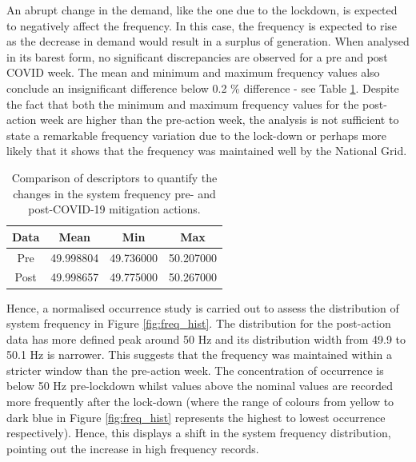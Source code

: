 \documentclass[energies,article,submit,moreauthors,pdftex]{Definitions/mdpi}
\begin{document}
An abrupt change in the demand, like the one due to the lockdown, is expected to negatively affect the frequency. In this case, the frequency is expected to rise as the decrease in demand would result in a surplus of generation.
When analysed in its barest form, no significant discrepancies are observed for a pre and post COVID week. The mean and minimum and maximum frequency values also conclude an insignificant difference below 0.2 \% difference - see Table \ref{table:freq_table}. Despite the fact that both the minimum and maximum frequency values for the post-action week are higher than the pre-action week, the analysis is not sufficient to state a remarkable frequency variation due to the lock-down or perhaps more likely that it shows that the frequency was maintained well by the National Grid. 

\begin{table}[H]
\caption{Comparison of descriptors to quantify the changes in the system frequency pre- and post-COVID-19 mitigation actions.}\label{table:freq_table}
\centering
\begin{tabular}{cccc}
\toprule
\textbf{Data} & \textbf{Mean}	& \textbf{Min}	& \textbf{Max}\\
\midrule
Pre		& 49.998804			& 49.736000         & 50.207000\\
Post	& 49.998657			& 49.775000         &50.267000\\

\bottomrule
\end{tabular}
\end{table}

Hence, a normalised occurrence study is carried out to assess the distribution of system frequency in Figure \ref{fig:freq_hist}. The distribution for the post-action data has more defined peak around 50 Hz and its distribution width from 49.9 to 50.1 Hz is narrower. This suggests that the frequency was maintained within a stricter window than the pre-action week. The concentration of occurrence is below 50 Hz pre-lockdown whilst values above the nominal values are recorded more frequently after the lock-down (where the range of colours from yellow to dark blue in Figure \ref{fig:freq_hist} represents the highest to lowest occurrence respectively).
Hence, this displays a shift in the system frequency distribution, pointing out the increase in high frequency records. 
\end{document}
